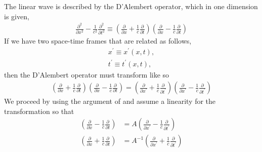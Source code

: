 The linear wave is described by the D'Alembert operator, which in one dimension is given,
\begin{align}
  \frac{\partial^2 }{\partial x^2} - \frac{1}{c^2}\frac{\partial^2 }{\partial t^2} \equiv
  \left(\frac{\partial }{\partial x}  + \frac{1}{c}\frac{\partial }{\partial t}\right)
  \left(\frac{\partial }{\partial x}  - \frac{1}{c}\frac{\partial }{\partial t}\right)
\end{align}
If we have two space-time frames that are related as follows,
\begin{align}
  x^\prime \equiv x^\prime(x,t),\\
  t^\prime \equiv t^\prime(x,t),
\end{align}
then the D'Alembert operator must transform like so
\begin{align}
  \left(\frac{\partial }{\partial x}  + \frac{1}{c}\frac{\partial }{\partial t}\right)
  \left(\frac{\partial }{\partial x}  - \frac{1}{c}\frac{\partial }{\partial t}\right) =
  \left(\frac{\partial }{\partial x^\prime}  + \frac{1}{c}\frac{\partial }{\partial t^\prime}\right)
  \left(\frac{\partial }{\partial x^\prime}  - \frac{1}{c}\frac{\partial }{\partial t^\prime}\right)
\end{align}
We proceed by using the argument of \cite{Heras2016} and assume a linearity for the transformation so that
\begin{align}
  \left(\frac{\partial }{\partial x}  - \frac{1}{c}\frac{\partial }{\partial t}\right) &=
  A \left(\frac{\partial }{\partial x^\prime}  - \frac{1}{c}\frac{\partial }{\partial t^\prime}\right) \\
  \left(\frac{\partial }{\partial x}  + \frac{1}{c}\frac{\partial }{\partial t}\right) &=
  A^{-1}\left(\frac{\partial }{\partial x^\prime} + \frac{1}{c}\frac{\partial }{\partial t^\prime}\right)
\end{align}


